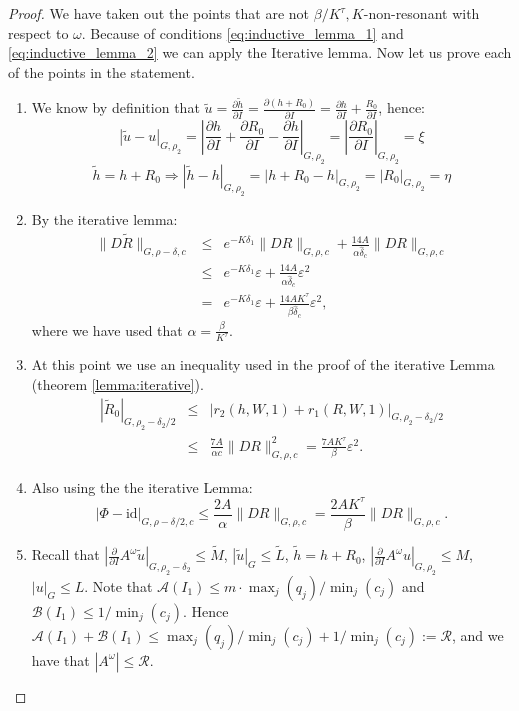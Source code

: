 \begin{proof}
We have taken out the points that are not $\beta/K^\tau,K$-non-resonant with respect to $\omega$.
Because of conditions \ref{eq:inductive_lemma_1} and \ref{eq:inductive_lemma_2} we can apply the Iterative lemma.
Now let us prove each of the points in the statement.
\begin{enumerate}
\item We know by definition that $\tilde{u} = \frac{\partial \tilde{h}}{\partial I} = \frac{\partial (h + R_0)}{\partial I} = \frac{\partial h}{\partial I} + \frac{R_0}{\partial I}$, hence:
$$|\tilde u - u|_{G,\rho_2} = |\frac{\partial h}{\partial I} +\frac{\partial R_0}{\partial I} - \frac{\partial h}{\partial I}|_{G,\rho_2} = |\frac{\partial R_0}{\partial I}|_{G,\rho_2} = \xi$$
$$\tilde h = h + R_0 \Rightarrow |\tilde h - h|_{G,\rho_2} = |h + R_0 - h|_{G,\rho_2} = |R_0|_{G,\rho_2} = \eta$$
\item By the iterative lemma:
$$ \begin{array}{rcl}
\|D \tilde R\|_{G,\rho-\delta,c} & \leq & e^{-K \delta_1}\|DR\|_{G,\rho,c} + \frac{14A}{\alpha \hat \delta_c}\|DR\|_{G,\rho,c}\\
 & \leq & e^{-K\delta_1}\varepsilon + \frac{14A}{\alpha \hat \delta_c}\varepsilon^2\\
 & = & e^{-K\delta_1}\varepsilon + \frac{14A K^\tau}{\beta \hat \delta_c}\varepsilon^2,
\end{array}
$$
where we have used that $\alpha = \frac{\beta}{K^\tau}$.
\item At this point we use an inequality used in the proof of the iterative Lemma (theorem \ref{lemma:iterative}).
$$\begin{array}{rcl}
|\tilde R_0|_{G,\rho_2 - \delta_2/2} & \leq & |r_2(h,W,1) + r_1(R,W,1)|_{G,\rho_2 - \delta_2/2}\\
 & \leq & \frac{7A}{\alpha c} \|DR\|^2_{G,\rho,c} = \frac{7AK^\tau}{\beta}\varepsilon^2.
\end{array}$$
\item Also using the the iterative Lemma:
$$|\Phi-\text{id}|_{G,\rho-\delta/2,c} \leq \frac{2A}{\alpha} \|DR\|_{G,\rho,c} = \frac{2AK^\tau}{\beta}\|DR\|_{G,\rho,c}.$$
\item Recall that $|\frac{\partial}{\partial I} A^\omega \tilde u|_{G,\rho_2 - \delta_2}\leq \tilde M$, $|\tilde u|_G \leq \tilde L$, $\tilde h = h + R_0$, $|\frac{\partial}{\partial I} A^\omega u|_{G,\rho_2}\leq M$, $|u|_G \leq L$.
Note that $\mathcal{A}(I_1) \leq m \cdot \max_j(q_j)/\min_j(c_j)$ and $\mathcal{B}(I_1) \leq 1/ \min_j(c_j)$. Hence $\mathcal{A}(I_1) + \mathcal{B}(I_1) \leq \max_j(q_j)/\min_j(c_j) + 1/ \min_j(c_j) := \mathcal{R}$, and we have that $|A^\omega| \leq \mathcal{R}$.

\end{enumerate}
\end{proof}
